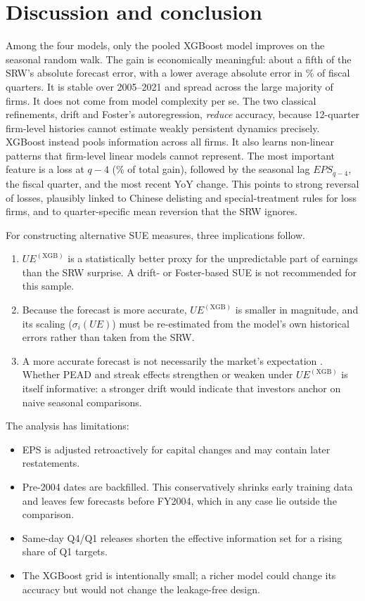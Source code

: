 \documentclass[11pt]{article}
\begin{document}
\section{Discussion and conclusion}

Among the four models, only the pooled XGBoost model improves on the seasonal random walk. The gain is economically
meaningful: about a fifth of the SRW's absolute forecast error, with a lower average absolute error in
\QbetterMAExgb\% of fiscal quarters. It is stable over 2005--2021 and spread across the large majority of firms. It does not come from model complexity per se.
The two classical refinements, drift and Foster's autoregression, \emph{reduce} accuracy, because 12-quarter
firm-level histories cannot estimate weakly persistent dynamics precisely. XGBoost instead pools information across
all firms. It also learns non-linear patterns that firm-level linear models cannot represent. The most important
feature is a loss at $q-4$ (\TopImpShare\% of total gain), followed by the seasonal lag $EPS_{q-4}$, the fiscal quarter,
and the most recent YoY change. This points to strong reversal of losses, plausibly linked to Chinese delisting and
special-treatment rules for loss firms, and to quarter-specific mean reversion that the SRW ignores.

For constructing alternative SUE measures, three implications follow.
\begin{enumerate}
\item $UE^{(\text{XGB})}$ is a statistically better proxy for the unpredictable part of earnings than the SRW surprise.
A drift- or Foster-based SUE is not recommended for this sample.
\item Because the forecast is more accurate, $UE^{(\text{XGB})}$ is smaller in magnitude, and its scaling ($\sigma_i(UE)$)
must be re-estimated from the model's own historical errors rather than taken from the SRW.
\item A more accurate forecast is not necessarily the market's expectation \citep{campbell2026}. Whether PEAD and
streak effects strengthen or weaken under $UE^{(\text{XGB})}$ is itself informative: a stronger drift would indicate
that investors anchor on naive seasonal comparisons.
\end{enumerate}

The analysis has limitations:
\begin{itemize}
\item EPS is adjusted retroactively for capital changes and may contain later restatements.
\item Pre-2004 dates are backfilled. This conservatively shrinks early training data and leaves few forecasts before
FY2004, which in any case lie outside the comparison.
\item Same-day Q4/Q1 releases shorten the effective information set for a rising share of Q1 targets.
\item The XGBoost grid is intentionally small; a richer model could change its accuracy but would not change the
leakage-free design.
\end{itemize}
\end{document}
